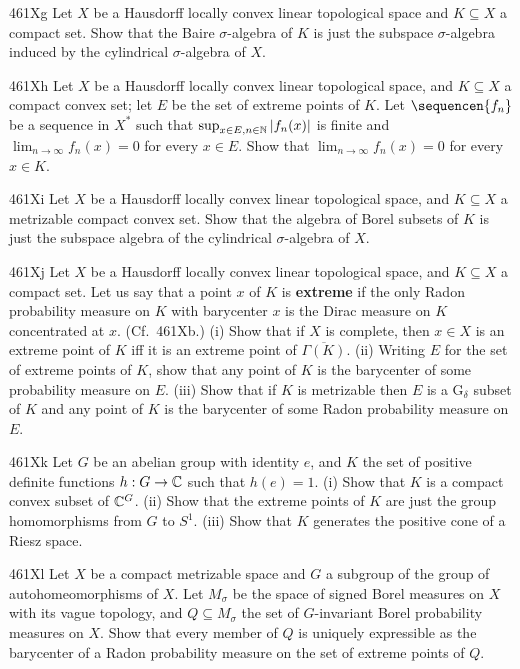 {\spheader 461Xg Let $X$ be a Hausdorff locally convex linear topological
space and $K\subseteq X$ a compact set.   Show that the Baire
$\sigma$-algebra of $K$ is just the subspace $\sigma$-algebra induced by
the cylindrical $\sigma$-algebra of $X$.

\sqheader 461Xh Let $X$ be a Hausdorff locally convex linear topological
space, and $K\subseteq X$ a compact convex set;  let $E$ be the set of
extreme points of $K$.   Let $\sequencen{f_n}$ be a sequence in $X^*$
such that $\sup_{x\in E,n\in\Bbb N}|f_n(x)|$ is finite and
$\lim_{n\to\infty}f_n(x)=0$ for every $x\in E$.   Show that
$\lim_{n\to\infty}f_n(x)=0$ for every $x\in K$.

\sqheader 461Xi Let $X$ be a Hausdorff locally convex linear topological
space, and $K\subseteq X$ a metrizable compact convex set.
Show that the algebra of Borel subsets of $K$ is just the
subspace algebra of the cylindrical $\sigma$-algebra of $X$.

\spheader 461Xj Let $X$ be a Hausdorff locally convex linear topological
space, and $K\subseteq X$ a compact set.   Let us say that a point $x$
of $K$ is {\bf extreme} if the only Radon probability measure on $K$
with barycenter $x$ is the Dirac measure on $K$ concentrated at $x$.
(Cf.\ 461Xb.)
(i) Show that if $X$ is complete, then $x\in X$ is an extreme point of
$K$ iff it is an extreme point of $\overline{\Gamma(K)}$.   (ii)
Writing $E$ for the set of extreme points of $K$, show that any point of
$K$ is the barycenter of some probability measure on $E$.   (iii) Show
that if $K$ is metrizable then $E$ is a G$_{\delta}$ subset of $K$ and
any point of $K$ is the barycenter of some Radon probability measure on
$E$.

\spheader 461Xk Let $G$ be an abelian group with identity $e$,
and $K$ the set of positive definite functions
$h:G\to\Bbb C$ such that $h(e)=1$.   (i) Show that $K$ is a compact convex
subset of $\Bbb C^G$.   (ii) Show that the extreme points of $K$ are just
the group homomorphisms from $G$ to $S^1$.
(iii) Show that $K$ generates the
positive cone of a Riesz space.   

\spheader 461Xl Let $X$ be a compact metrizable space and $G$ a subgroup
of the group of autohomeomorphisms of $X$.   Let $M_{\sigma}$ be the space
of signed Borel measures on $X$ with its vague topology, and
$Q\subseteq M_{\sigma}$ the set of $G$-invariant Borel probability measures
on $X$.   Show that every member of $Q$ is uniquely expressible as the
barycenter of a Radon probability
measure on the set of extreme points of $Q$.

}
